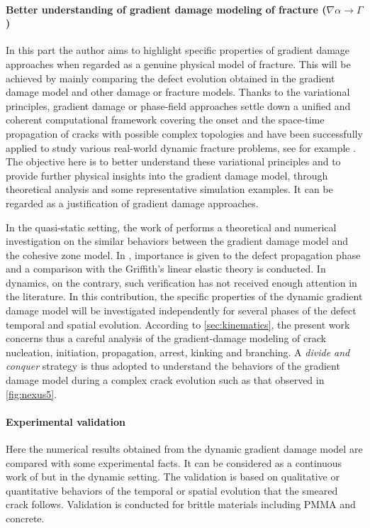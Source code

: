 \paragraph{Better understanding of gradient damage modeling of fracture ($\nabla\alpha\to\Gamma$)} In this part the author aims to highlight specific properties of gradient damage approaches when regarded as a genuine physical model of fracture. This will be achieved by mainly comparing the defect evolution obtained in the gradient damage model and other damage or fracture models. Thanks to the variational principles, gradient damage or phase-field approaches settle down a unified and coherent computational framework covering the onset and the space-time propagation of cracks with possible complex topologies and have been successfully applied to study various real-world dynamic fracture problems, see for example \cite{HofackerMiehe:2012,BordenVerhooselScottHughesLandis:2012,SchlueterWillenbuecherKuhnMueller:2014,DallyWeinberg:2015}. The objective here is to better understand these variational principles and to provide further physical insights into the gradient damage model, through theoretical analysis and some representative simulation examples. It can be regarded as a justification of gradient damage approaches.

In the quasi-static setting, the work of \cite{LorentzCuvilliezKazymyrenko:2011,LorentzCuvilliezKazymyrenko:2012} performs a theoretical and numerical investigation on the similar behaviors between the gradient damage model and the cohesive zone model. In \cite{SicsicMarigo:2013,HossainHsuehBourdinBhattachary:2014,KlinsmannRosatoKamlahMcMeeking:2015}, importance is given to the defect propagation phase and a comparison with the Griffith's linear elastic theory is conducted. In dynamics, on the contrary, such verification has not received enough attention in the literature. In this contribution, the specific properties of the dynamic gradient damage model will be investigated independently for several phases of the defect temporal and spatial evolution. According to \cref{sec:kinematics}, the present work concerns thus a careful analysis of the gradient-damage modeling of crack nucleation, initiation, propagation, arrest, kinking and branching. A \emph{divide and conquer} strategy is thus adopted to understand the behaviors of the gradient damage model during a complex crack evolution such as that observed in \cref{fig:nexus5}.

\paragraph{Experimental validation} Here the numerical results obtained from the dynamic gradient damage model are compared with some experimental facts. It can be considered as a continuous work of \cite{MesgarnejadBourdinKhonsari:2014} but in the dynamic setting. The validation is based on qualitative or quantitative behaviors of the temporal or spatial evolution that the smeared crack follows. Validation is conducted for brittle materials including PMMA and concrete.

